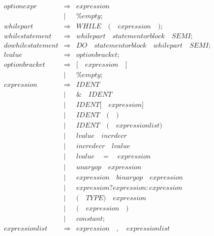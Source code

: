 \documentclass{article}
\begin{document}
\begin{eqnarray}
   \mathit{optionexpr} & \Rightarrow & \mathit{expression} \\
   &  | & \mathit{\%empty};\\
   \mathit{whilepart} & \Rightarrow & \mathit{WHILE}\quad \mathit{(} \quad \mathit{expression}\quad\mathit{)} ; \\
   \mathit{whilestatement} & \Rightarrow & \mathit{whilepart} \quad \mathit{statementorblock} \quad \mathit{SEMI} ; \\
   \mathit{dowhilestatement} & \Rightarrow & \mathit{DO} \quad \mathit{statementorblock} \quad \mathit{whilepart} \quad \mathit{SEMI} ; \\
   \mathit{lvalue} & \Rightarrow & \mathit{optionbracket} ; \\
   \mathit{optionbracket} & \Rightarrow & \mathit{[}\quad\mathit{expression}\quad\mathit{]}\\
   &|& \mathit{\%empty};\\
   \mathit{expression} & \Rightarrow & \mathit{IDENT}\\
    & | & \mathit{\&} \quad \mathit{IDENT}\\
    & | & \mathit{IDENT} \mathit{[}\quad\mathit{expression}\mathit{]}\\
    & | & \mathit{IDENT}\quad\mathit{(}\quad\mathit{)} \\
    & | & \mathit{IDENT} \quad \mathit{(} \quad\mathit{expressionlist} \mathit{)}\\
    & | & \mathit{lvalue} \quad \mathit{incrdecr} \\
    & | & \mathit{incredecr} \quad \mathit{lvalue} \\
    & | & \mathit{lvalue} \quad \mathit{=} \quad \mathit{expression}\\
    & | & \mathit{unaryop} \quad \mathit{expression}\\
    & | & \mathit{expression} \quad \mathit{binaryop} \quad \mathit{expression}\\
    & | & \mathit{expression} \mathit{?} \mathit{expression}\mathit{:}\mathit{expression}\\
    & | & \mathit{(}\quad\mathit{TYPE}\mathit{)}\quad\mathit{expression}\\
    & | & \mathit{(}\quad\mathit{expression}\quad\mathit{)}\\
    & | & \mathit{constant} ; \\
    \mathit{expressionlist} & \Rightarrow & \mathit{expression}\quad \mathit{,}\quad\mathit{expressionlist}\\

\end{eqnarray}
\end{document}
